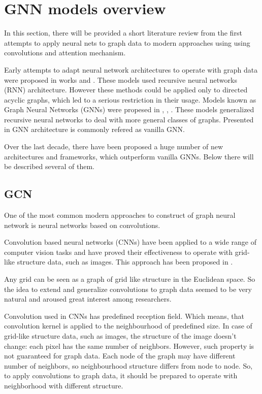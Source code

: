 \section{GNN models overview}
\label{sec:models}



In this section, there will be provided a short literature review from the first attempts to
apply neural nets to graph data to modern approaches using using convolutions and attention mechanism.



Early attempts to adapt neural network architectures to operate with graph data 
were proposed in works \cite{FirstGNN1} and  \cite{FirstGNN2}. These models 
used recursive neural networks (RNN) architecture. However these methods could be applied
only to directed acyclic graphs, which led to a serious restriction in their usage.
Models known as Graph Neural Networks (GNNs) were propesed in  \cite{GNNlist1}, \cite{GNNlist2}, \cite{GNN}.
These models generalized recursive neural networks to deal with more general classes of graphs.
Presented in \cite{GNN} GNN architecture is commonly refered as vanilla GNN.


Over the last decade, there have been proposed a huge number of new architectures and frameworks, which 
outperform vanilla GNNs. Below there will be described several of them. 

\subsection{GCN}
One of the most common modern approaches to construct of graph neural network is
neural networks based on convolutions.

Convolution based neural networks (CNNs) have been applied to a wide range of computer
vision tasks and have proved their effectiveness to operate with grid-like structure data, such as images.
This approach has been proposed in \cite{CNN}.

Any grid can be seen as a graph of grid like structure in the Euclidean space. So the idea to extend and generalize
convolutions to graph data seemed to be very natural and aroused great interest among researchers.


Convolution used in CNNs has predefined reception field. Which means, that convolution kernel is 
applied to the neighbourhood of predefined size. In case of grid-like structure data, such as
images, the structure of the image doesn't change: each pixel has the same number of neighbors. 
However, such property is not guaranteed for graph data. Each node of the graph may have 
different number of neighbors, so neighbourhood structure differs from node to node. So,
to apply convolutions to graph data, it should be prepared to operate with neighborhood 
with different structure.

